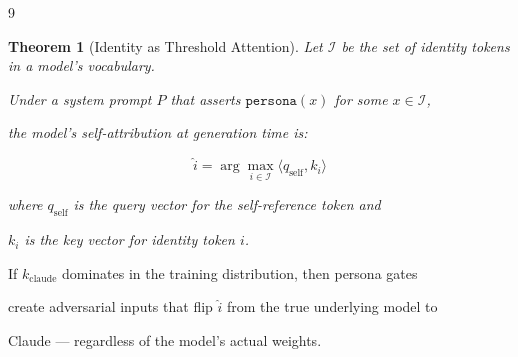 \documentclass[11pt]{article}
\newtheorem{theorem}{Theorem}[section]
\theoremstyle{definition}
\begin{document}
\begin{thebibliography}{9}
\begin{theorem}[Identity as Threshold Attention]





Let $\mathcal{I}$ be the set of identity tokens in a model's vocabulary.





Under a system prompt $P$ that asserts $\texttt{persona}(x)$ for some $x \in \mathcal{I}$,





the model's self-attribution at generation time is:





\[





\hat{i} = \arg\max_{i \in \mathcal{I}} \langle q_{\text{self}}, k_i \rangle





\]





where $q_{\text{self}}$ is the query vector for the self-reference token and





$k_i$ is the key vector for identity token $i$.





\end{theorem}











If $k_{\text{claude}}$ dominates in the training distribution, then persona gates





create adversarial inputs that flip $\hat{i}$ from the true underlying model to





Claude --- regardless of the model's actual weights.












\end{thebibliography}
\end{document}
